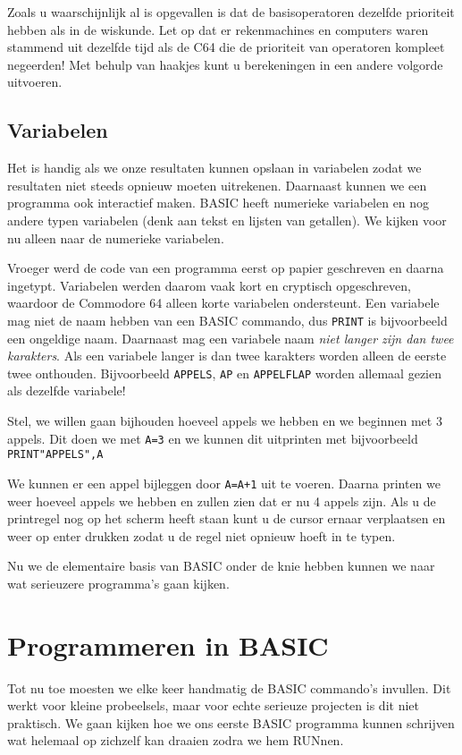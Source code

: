 \documentclass{article}
\begin{document}
Zoals u waarschijnlijk al is opgevallen is dat de basisoperatoren dezelfde prioriteit hebben als in de wiskunde.
Let op dat er rekenmachines en computers waren stammend uit dezelfde tijd als de C64 die de prioriteit van operatoren kompleet negeerden!
Met behulp van haakjes kunt u berekeningen in een andere volgorde uitvoeren.

\subsection{Variabelen}

Het is handig als we onze resultaten kunnen opslaan in variabelen zodat we resultaten niet steeds opnieuw moeten uitrekenen.
Daarnaast kunnen we een programma ook interactief maken.
BASIC heeft numerieke variabelen en nog andere typen variabelen (denk aan tekst en lijsten van getallen).
We kijken voor nu alleen naar de numerieke variabelen.

Vroeger werd de code van een programma eerst op papier geschreven en daarna ingetypt.
Variabelen werden daarom vaak kort en cryptisch opgeschreven, waardoor de Commodore 64 alleen korte variabelen ondersteunt.
Een variabele mag niet de naam hebben van een BASIC commando, dus \verb:PRINT: is bijvoorbeeld een ongeldige naam.
Daarnaast mag een variabele naam \emph{niet langer zijn dan twee karakters}.
Als een variabele langer is dan twee karakters worden alleen de eerste twee onthouden.
Bijvoorbeeld \verb:APPELS:, \verb:AP: en \verb:APPELFLAP: worden allemaal gezien als dezelfde variabele!

Stel, we willen gaan bijhouden hoeveel appels we hebben en we beginnen met 3 appels.
Dit doen we met \verb:A=3: en we kunnen dit uitprinten met bijvoorbeeld \verb:PRINT"APPELS",A:

We kunnen er een appel bijleggen door \verb:A=A+1: uit te voeren.
Daarna printen we weer hoeveel appels we hebben en zullen zien dat er nu 4 appels zijn.
Als u de printregel nog op het scherm heeft staan kunt u de cursor ernaar verplaatsen en weer op enter drukken zodat u de regel niet opnieuw hoeft in te typen.

Nu we de elementaire basis van BASIC onder de knie hebben kunnen we naar wat serieuzere programma's gaan kijken.

\section{Programmeren in BASIC}

Tot nu toe moesten we elke keer handmatig de BASIC commando's invullen.
Dit werkt voor kleine probeelsels, maar voor echte serieuze projecten is dit niet praktisch.
We gaan kijken hoe we ons eerste BASIC programma kunnen schrijven wat helemaal op zichzelf kan draaien zodra we hem RUNnen.
\end{document}
